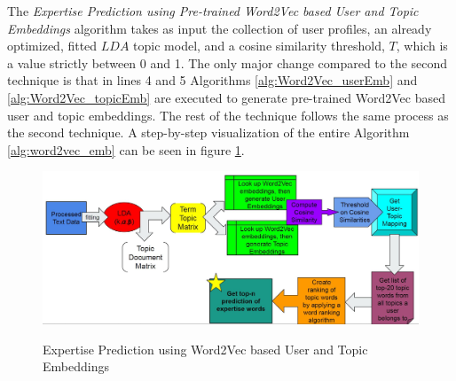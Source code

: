             The \emph{Expertise Prediction using Pre-trained Word2Vec based User and Topic Embeddings} algorithm takes as input the collection of user profiles, an already optimized, fitted $LDA$ topic model, and a cosine similarity threshold, $T$, which is a value strictly between 0 and 1. The only major change compared to the second technique is that in lines 4 and 5 Algorithms \ref{alg:Word2Vec_userEmb} and \ref{alg:Word2Vec_topicEmb} are executed to generate pre-trained Word2Vec based user and topic embeddings. The rest of the technique follows the same process as the second technique. A step-by-step visualization of the entire Algorithm \ref{alg:word2vec_emb} can be seen in figure \ref{fig:technique3}.
            
            \begin{figure}[!ht]
              \centering
              \includegraphics[width=\textwidth]{figures/technique3.JPG}\\
              \caption{Expertise Prediction using Word2Vec based User and Topic Embeddings}
              \label{fig:technique3}
            \end{figure}
        
